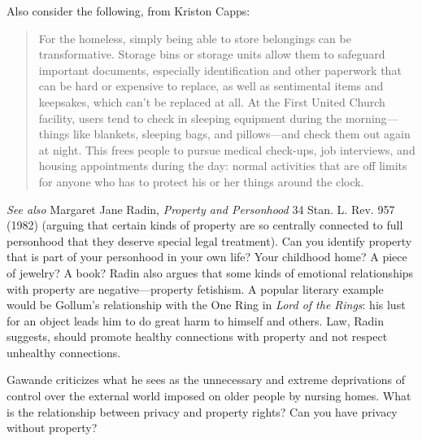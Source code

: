 Also consider the following,
from Kriston Capps:
\begin{quote}
For the homeless, simply being able to store belongings can be transformative.
Storage bins or storage units allow them to safeguard important documents,
especially identification and other paperwork that can be hard or expensive to
replace, as well as sentimental items and keepsakes, which can't be replaced at
all. At the First United Church facility, users tend to check in sleeping
equipment during the morning---things like blankets, sleeping bags, and
pillows---and check them out again at night. This frees people to pursue
medical check-ups, job interviews, and housing appointments during the day:
normal activities that are off limits for anyone who has to protect his or her
things around the clock.
\end{quote}
\emph{See also} Margaret Jane Radin, \emph{Property and Personhood} 34 Stan. L.
Rev. 957
(1982) (arguing that certain kinds of property are so centrally connected to
full personhood that they deserve special legal treatment). Can you identify
property that is part of your personhood in your own life?  Your childhood
home?  A piece of jewelry?  A book?  Radin also argues that some kinds of
emotional relationships with property are negative---property fetishism.  A
popular literary example would be Gollum's relationship with the One Ring in
\textit{Lord of the Rings}: his lust for an object leads him to do great harm
to himself and others.  Law, Radin suggests, should promote healthy connections
with property and not respect unhealthy connections.

Gawande criticizes what he sees as the unnecessary and extreme deprivations of
control over the external world imposed on older people by nursing homes.  What
is the relationship between privacy and property rights?  Can you have privacy
without property?

